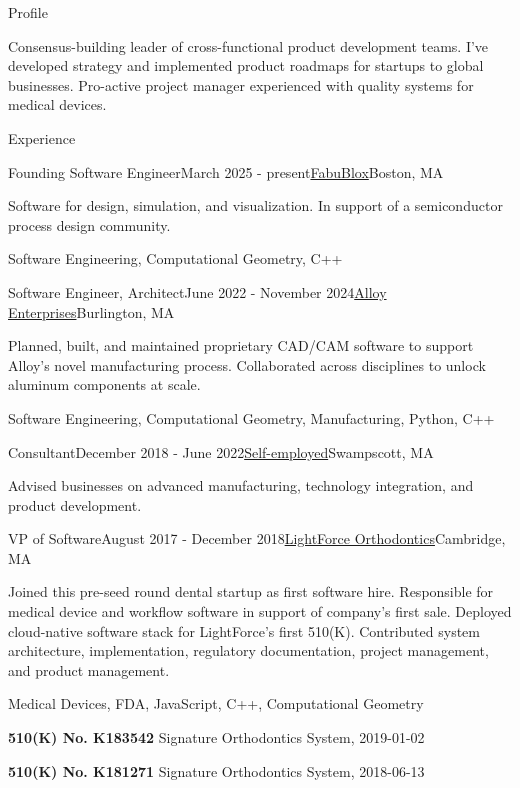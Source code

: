 \documentclass{resume}
\begin{document}
\begin{rSection}{Profile}
\item Consensus-building leader of cross-functional product development teams. I've developed strategy and implemented product roadmaps for startups to global businesses. Pro-active project manager experienced with quality systems for medical devices.
\end{rSection}

\begin{rSection}{Experience}

\begin{rSubsection}{Founding Software Engineer}{March 2025 - present}{\href{https://fabublox.com}{FabuBlox}}{Boston, MA}
\item Software for design, simulation, and visualization. In support of a semiconductor process design community.
\item Software Engineering, Computational Geometry, C++    
    
\begin{rSubsection}{Software Engineer, Architect}{June 2022 - November 2024}{\href{https://alloyenterprises.co}{Alloy Enterprises}}{Burlington, MA}
\item Planned, built, and maintained proprietary CAD/CAM software to support Alloy's novel manufacturing process. Collaborated across disciplines to unlock aluminum components at scale.
\item Software Engineering, Computational Geometry, Manufacturing, Python, C++
\end{rSubsection}

\begin{rSubsection}{Consultant}{December 2018 - June 2022}{\href{https://metatooth.com/services}{Self-employed}}{Swampscott, MA}
\item Advised businesses on advanced manufacturing, technology integration, and product development.
\end{rSubsection}

\begin{rSubsection}{VP of Software}{August 2017 - December 2018}{\href{https://lightforceortho.com}{LightForce Orthodontics}}{Cambridge, MA}
\item Joined this pre-seed round dental startup as first software hire. Responsible for medical device and workflow software in support of company's first sale. Deployed cloud-native software stack for LightForce's first 510(K). Contributed system architecture, implementation, regulatory documentation, project management, and product management.
\item Medical Devices, FDA, JavaScript, C++, Computational Geometry
\item \textbf{510(K) No. K183542} Signature Orthodontics System, 2019-01-02
\item \textbf{510(K) No. K181271} Signature Orthodontics System, 2018-06-13
\end{rSubsection}


\end{rSubsection}
\end{rSection}
\end{document}
